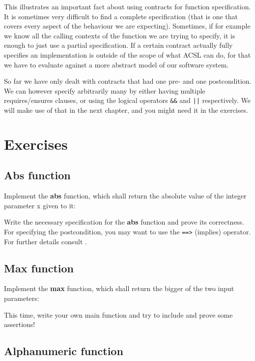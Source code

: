 This illustrates an important fact about using contracts for function specification. It is sometimes very difficult to find a complete specification (that is one that covers every aspect of the behaviour we are expecting). Sometimes, if for example we know all the calling contexts of the function we are trying to specify, it is enough to just use a partial specification. If a certain contract actually fully specifies an implementation is outside of the scope of what ACSL can do, for that we have to evaluate against a more abstract model of our software system.

So far we have only dealt with contracts that had one pre- and one postcondition. We can however specify arbitrarily many by either having multiple requires/ensures clauses, or using the logical operators \texttt{&&} and \texttt{||} respectively. We will make use of that in the next chapter, and you might need it in the exercises. 

\section{Exercises}

\subsection{Abs function}

Implement the \textbf{abs} function, which shall return the absolute value of the integer parameter x given to it:


Write the necessary specification for the \textbf{abs} function and prove its correctness. For specifying the postcondition, you may want to use the \texttt{==>} (implies) operator. For further details consult \cite{baudin_acsl_nodate}. 

\subsection{Max function}

Implement the \textbf{max} function, which shall return the bigger of the two input parameters:


This time, write your own main function and try to include and prove some assertions! 

\subsection{Alphanumeric function}

